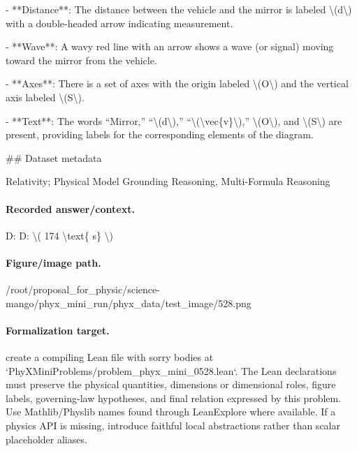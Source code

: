 - **Distance**: The distance between the vehicle and the mirror is labeled \textbackslash{}(d\textbackslash{}) with a double-headed arrow indicating measurement.

- **Wave**: A wavy red line with an arrow shows a wave (or signal) moving toward the mirror from the vehicle.

- **Axes**: There is a set of axes with the origin labeled \textbackslash{}(O\textbackslash{}) and the vertical axis labeled \textbackslash{}(S\textbackslash{}).

- **Text**: The words “Mirror,” “\textbackslash{}(d\textbackslash{}),” “\textbackslash{}(\textbackslash{}vec\{v\}\textbackslash{}),” \textbackslash{}(O\textbackslash{}), and \textbackslash{}(S\textbackslash{}) are present, providing labels for the corresponding elements of the diagram.

\#\# Dataset metadata

Relativity; Physical Model Grounding Reasoning, Multi-Formula Reasoning

\paragraph{Recorded answer/context.}
D: D: \textbackslash{}( 174 \textbackslash{}text\{ s\} \textbackslash{})

\paragraph{Figure/image path.}
/root/proposal\_for\_physic/science-mango/phyx\_mini\_run/phyx\_data/test\_image/528.png

\paragraph{Formalization target.}
create a compiling Lean file with sorry bodies at `PhyXMiniProblems/problem\_phyx\_mini\_0528.lean`. The Lean declarations must preserve the physical quantities, dimensions or dimensional roles, figure labels, governing-law hypotheses, and final relation expressed by this problem.
Use Mathlib/Physlib names found through LeanExplore where available. If a physics API is missing, introduce faithful local abstractions rather than scalar placeholder aliases.

